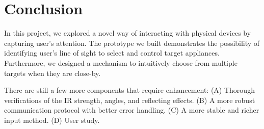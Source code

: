 
\section{Conclusion}
\label{sec:conclusion}

In this project, we explored a novel way of interacting with physical devices by capturing user's attention. The prototype we built demonstrates the possibility of identifying user's line of sight to select and control target appliances. Furthermore, we designed a mechanism to intuitively choose from multiple targets when they are close-by. 

There are still a few more components that require enhancement: (A) Thorough verifications of the IR strength, angles, and reflecting effects. (B) A more robust communication protocol with better error handling. (C) A more stable and richer input method. (D) User study.



